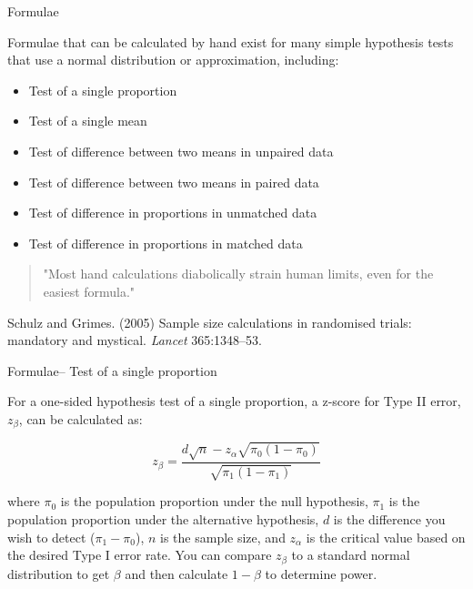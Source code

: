 \documentclass[ignorenonframetext,]{beamer}
\providecommand{\tightlist}{%
  \setlength{\itemsep}{0pt}\setlength{\parskip}{0pt}}
\begin{document}
\begin{frame}{Formulae}

Formulae that can be calculated by hand exist for many simple hypothesis
tests that use a normal distribution or approximation, including:

\begin{itemize}
\tightlist
\item
  Test of a single proportion
\item
  Test of a single mean
\item
  Test of difference between two means in unpaired data
\item
  Test of difference between two means in paired data
\item
  Test of difference in proportions in unmatched data
\item
  Test of difference in proportions in matched data
\end{itemize}

\begin{block}{}
\begin{quotation}"Most hand calculations diabolically strain human limits, even for the easiest formula."\end{quotation}

\footnotesize{Schulz and Grimes. (2005) Sample size calculations in randomised trials: mandatory and mystical. \textit{Lancet} 365:1348--53.}
\end{block}

\end{frame}

\begin{frame}{Formulae-- Test of a single proportion}

For a one-sided hypothesis test of a single proportion, a z-score for
Type II error, \(z_{\beta}\), can be calculated as:

\[
z_{\beta} = \frac{d\sqrt{n}-z_{\alpha}\sqrt{\pi_0(1-\pi_0)}}{\sqrt{\pi_1(1 - \pi_1)}}
\]

where \(\pi_0\) is the population proportion under the null hypothesis,
\(\pi_1\) is the population proportion under the alternative hypothesis,
\(d\) is the difference you wish to detect (\(\pi_1 - \pi_0\)), \(n\) is
the sample size, and \(z_{\alpha}\) is the critical value based on the
desired Type I error rate. You can compare \(z_{\beta}\) to a standard
normal distribution to get \(\beta\) and then calculate \(1 - \beta\) to
determine power.

\end{frame}
\end{document}
